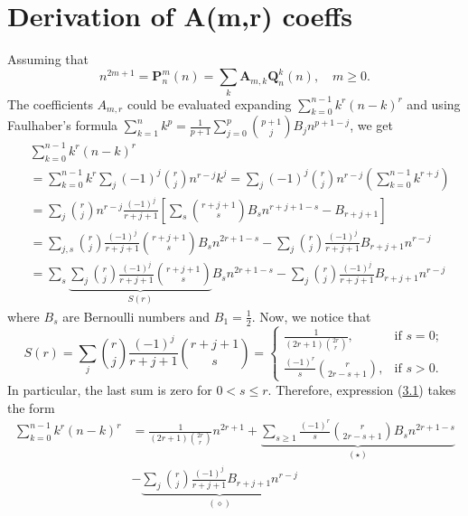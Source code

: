 \documentclass[12pt, letterpaper]{amsart}
\theoremstyle{definition}
\theoremstyle{remark}
\numberwithin{equation}{section}
\begin{document}
\section{Derivation of A(m,r) coeffs}
Assuming that 
\begin{equation*}
n^{2m+1} = \mathbf{P}^{m}_{n}(n) = \sum\limits_{k}\mathbf{A}_{m,k}\mathbf{Q}^{k}_{n}(n), \quad m\geq 0.
\end{equation*}
The coefficients $A_{m,r}$ could be evaluated expanding $\sum_{k=0}^{n-1}k^r(n-k)^r$ and using Faulhaber's formula $\sum _{k=1}^{n}k^{p}=\tfrac{1}{p+1}\sum _{j=0}^{p}{p+1 \choose j}B_{j}n^{p+1-j}$, we get
\begin{equation}\label{proof1}
\begin{split}
&\sum_{k=0}^{n-1}k^r(n-k)^r\\
&=\sum_{k=0}^{n-1} k^r \sum_{j} (-1)^j\binom{r}{j} n^{r-j}k^{j}=\sum_{j} (-1)^j\binom{r}{j} n^{r-j}\left(\sum_{k=0}^{n-1}k^{r+j}\right)\\
&=\sum_{j} \binom{r}{j} n^{r-j}\frac{(-1)^j}{r+j+1}\left[\sum_{s}\binom{r+j+1}{s}B_{s}n^{r+j+1-s}-B_{r+j+1}\right]\\
&=\sum_{j,s}\binom{r}{j}\frac{(-1)^j}{r+j+1}\binom{r+j+1}{s}B_{s}n^{2r+1-s}-\sum_{j} \binom{r}{j}\frac{(-1)^j}{r+j+1}B_{r+j+1}n^{r-j}\\
&=\sum_{s}\underbrace{\sum_{j}\binom{r}{j}\frac{(-1)^j}{r+j+1}\binom{r+j+1}{s}}_{S(r)}B_{s}n^{2r+1-s}-\sum_{j} \binom{r}{j}\frac{(-1)^j}{r+j+1}B_{r+j+1}n^{r-j}
\end{split}
\end{equation}
where $B_s$ are Bernoulli numbers and $B_1=\tfrac12$.
Now, we notice that
\begin{equation*}
S(r)=\sum_{j} \binom{r}{j}\frac{(-1)^j}{r+j+1}\binom{r+j+1}{s}
=\begin{cases}
\frac{1}{(2r+1)\binom{2r}r}, & \text{if } s=0;\\
\frac{(-1)^r}{s}\binom{r}{2r-s+1}, & \text{if } s>0.
\end{cases}
\end{equation*}
In particular, the last sum is zero for $0<s\leq r$. Therefore, expression (\hyperref[proof1]{3.1}) takes the form
\begin{equation*}
\begin{split}
\sum_{k=0}^{n-1}k^r(n-k)^r
&=\frac{1}{(2r+1)\binom{2r}r}n^{2r+1}+\underbrace{\sum_{s\geq 1}\frac{(-1)^r}{s}\binom{r}{2r-s+1}B_{s}n^{2r+1-s}}_{(\star)}\\
&-\underbrace{\sum_{j} \binom{r}{j}\frac{(-1)^j}{r+j+1}B_{r+j+1}n^{r-j}}_{(\diamond)}
\end{split}
\end{equation*}
\end{document}
